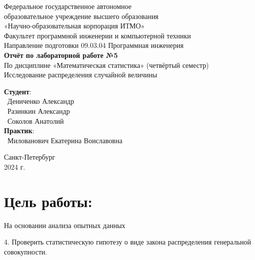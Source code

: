 \documentclass{article}
\begin{document}
\begin{center}
    \Large
    Федеральное государственное автономное \\
    образовательное учреждение высшего образования \\ 
    «Научно-образовательная корпорация ИТМО»\\
    \vspace{0.5cm}
    \large
    Факультет программной инженерии и компьютерной техники \\
    Направление подготовки 09.03.04 Программная инженерия \\
    \vspace{1cm}
    \Large
    \textbf{Отчёт по лабораторной работе №5} \\
    По дисциплине «Математическая статистика» (четвёртый семестр)\\
    Исследование распределения случайной величины\\
    \large
    \vspace{8cm}

    \begin{minipage}{.33\textwidth}
    \end{minipage}
    \hfill
    \begin{minipage}{.4\textwidth}
    
        \textbf{Студент}: \vspace{.1cm} \\
        \ Дениченко Александр\\
        \ Разинкин Александр\\
        \ Соколов Анатолий\\
        \textbf{Практик}:  \\
        \ Милованович Екатерина Воиславовна
    \end{minipage}
    \vfill
Санкт-Петербург\\ 2024 г.
\end{center}

\newpage
\section*{Цель работы:}
\large

На основании анализа опытных данных

4. Проверить статистическую гипотезу о виде закона распределения генеральной совокупности.
\end{document}
